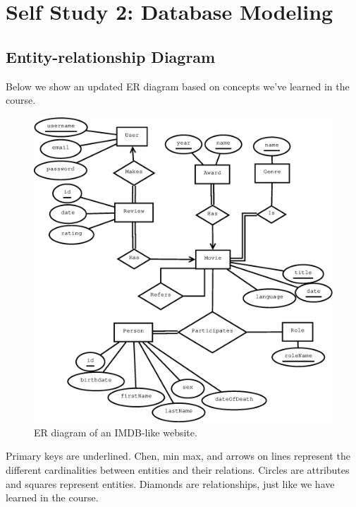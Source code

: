 \section{Self Study 2: Database Modeling}

\subsection{Entity-relationship Diagram}
Below we show an updated ER diagram based on concepts we've learned in the course.
\begin{figure}[H]
  \centering
  \includegraphics[width=\linewidth]{2-17.02.14/ERDiagram.eps}
  \caption{ER diagram of an IMDB-like website.}\label{fig:ERdiagram2}
\end{figure}

Primary keys are underlined. Chen, min max, and arrows on lines represent the different cardinalities between entities and their relations. Circles are attributes and squares represent entities. Diamonds are relationships, just like we have learned in the course.

